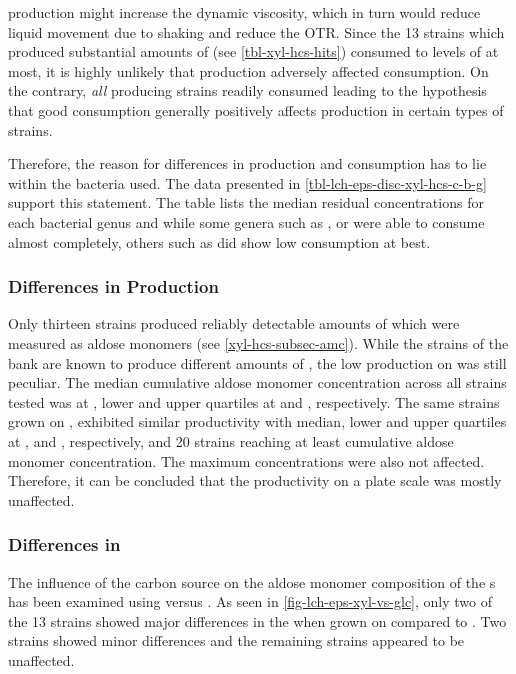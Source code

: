 \EPS{} production might increase the dynamic viscosity, which in turn would reduce liquid movement due to shaking and reduce the OTR. Since the 13 strains which produced substantial amounts of \eps{} (see \vref{tbl-xyl-hcs-hits}) consumed \xyl{} to levels of  at most, it is highly unlikely that \eps{} production adversely affected \xyl{} consumption. On the contrary, \textit{all} \eps{} producing strains readily consumed \xyl{} leading to the hypothesis that good \xyl{} consumption generally positively affects \eps{} production in certain types of strains.

Therefore, the reason for differences in \eps{} production and \xyl{} consumption has to lie within the bacteria used. The data presented in \vref{tbl-lch-eps-disc-xyl-hcs-c-b-g} support this statement. The table lists the median residual \xyl{} concentrations for each bacterial genus and while some genera such as ,  or  were able to consume \xyl{} almost completely, others such as  did show low \xyl{} consumption at best.

\subsubsection{Differences in \EPS{} Production}
Only thirteen strains produced reliably detectable amounts of \eps{} which were measured as aldose monomers (see \vref{xyl-hcs-subsec-amc}). While the strains of the \eps{} bank are known to produce different amounts of \eps{} \cite{Ruehmann2015b}, the low \eps{} production on \xyl{} was still peculiar. The median cumulative aldose monomer concentration across all strains tested was at , lower and upper quartiles at  and , respectively. %
The same strains grown on \glc{} \cite{Ruehmann2015b}, exhibited similar productivity with median, lower and upper quartiles at ,  and , respectively, and 20 strains reaching at least  cumulative aldose monomer concentration. %
The maximum concentrations were also not affected. Therefore, it can be concluded that the productivity on a plate scale was mostly unaffected.

\subsubsection{Differences in \EPS{} \AMC{}\label{subsubsec-lch-eps-disc-diff-eps-amc}}
The influence of the carbon source on the aldose monomer composition of the \eps{}s has been examined using \glc{} versus \xyl{}. As seen in \vref{fig-lch-eps-xyl-vs-glc}, only two of the 13 strains showed major differences in the \eps{} \amc{} when grown on \xyl{} compared to \glc{}. Two strains showed minor differences and the remaining strains appeared to be unaffected.

